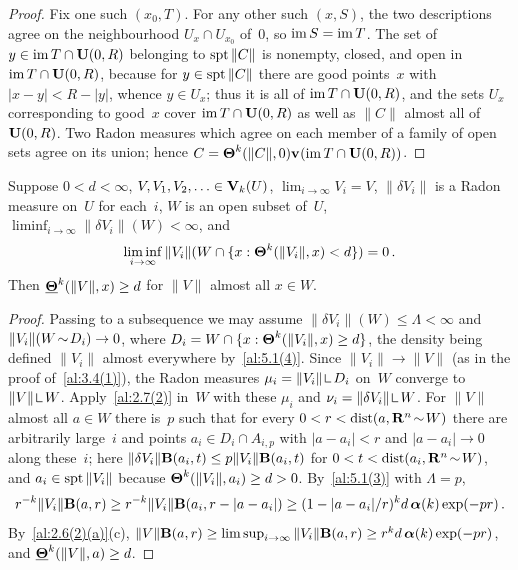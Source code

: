 \begin{proof}
    Fix one such $(x_0,T)$. For any other such $(x,S)$, the two descriptions agree on the
    neighbourhood $U_x \cap U_{x_0}$ of~$0$, so $\operatorname{im} S = \operatorname{im} T$. The set of $y \in \operatorname{im} T \cap
    \mathbf{U}(0,R)$ belonging to $\operatorname{spt} \|C\|$ is nonempty, closed, and open in $\operatorname{im} T \cap
    \mathbf{U}(0,R)$, because for $y \in \operatorname{spt} \|C\|$ there are good points~$x$ with $|x - y| < R -
    |y|$, whence $y \in U_x$; thus it is all of $\operatorname{im} T \cap \mathbf{U}(0,R)$, and the sets $U_x$
    corresponding to good~$x$ cover $\operatorname{im} T \cap \mathbf{U}(0,R)$ as well as $\|C\|$ almost all of
    $\mathbf{U}(0,R)$. Two Radon measures which agree on each member of a family of open sets agree on
    its union; hence $C = \boldsymbol{\Theta}^{k}(\|C\|,0) \mathbf{v}_{}(\operatorname{im} T \cap \mathbf{U}(0,R))$.
\end{proof}

\begin{lemma}
    \label{al:5.4}
    Suppose $0 < d < \infty$, $V, V_1, V_2, \ldots \in \mathbf{V}_{k}(U)$, $\lim_{i \to \infty} V_i
    = V$, $\|\delta V_i\|$ is a Radon measure on~$U$ for each~$i$, $W$ is an open subset of~$U$,
    $\liminf_{i \to \infty} \|\delta V_i\|(W) < \infty$, and
    \begin{displaymath}
        \liminf_{i \to \infty} \|V_i\|(W \cap \{ x : \boldsymbol{\Theta}^{k}(\|V_i\|,x) < d \}) = 0 \,.
    \end{displaymath}
    Then $\boldsymbol{\underline{\Theta}}^{k}(\|V\|,x) \ge d$ for $\|V\|$ almost all $x \in W$.
\end{lemma}

\begin{proof}
    Passing to a subsequence we may assume $\|\delta V_i\|(W) \le \Lambda < \infty$ and $\|V_i\|(W
    \!\sim\! D_i) \to 0$, where $D_i = W \cap \{ x : \boldsymbol{\Theta}^{k}(\|V_i\|,x) \ge d \}$, the
    density being defined $\|V_i\|$ almost everywhere by~\ref{al:5.1(4)}. Since $\|V_i\| \to
    \|V\|$ (as in the proof of~\ref{al:3.4(1)}), the Radon measures $\mu_i = \|V_i\| \restrict
    D_i$ on~$W$ converge to $\|V\| \restrict W$. Apply~\ref{al:2.7(2)} in~$W$ with these $\mu_i$
    and $\nu_i = \|\delta V_i\| \restrict W$. For $\|V\|$ almost all $a \in W$ there is~$p$ such
    that for every $0 < r < \operatorname{dist}(a, \mathbf{R}^{n} \!\sim\! W)$ there are arbitrarily large~$i$ and
    points $a_i \in D_i \cap A_{i,p}$ with $|a - a_i| < r$ and $|a - a_i| \to 0$ along these~$i$;
    here $\|\delta V_i\| \mathbf{B}(a_i,t) \le p \|V_i\| \mathbf{B}(a_i,t)$ for $0 < t <
    \operatorname{dist}(a_i, \mathbf{R}^{n} \!\sim\! W)$, and $a_i \in \operatorname{spt} \|V_i\|$ because
    $\boldsymbol{\Theta}^{k}(\|V_i\|,a_i) \ge d > 0$. By~\ref{al:5.1(3)} with $\Lambda = p$,
    \begin{displaymath}
        r^{-k} \|V_i\| \mathbf{B}(a,r) \ge r^{-k} \|V_i\| \mathbf{B}(a_i,r - |a - a_i|) \ge (1 - |a
        - a_i|/r)^{k} d \, \boldsymbol{\alpha}(k) \exp(-p r) \,.
    \end{displaymath}
    By~\ref{al:2.6(2)(a)}(c), $\|V\| \mathbf{B}(a,r) \ge \limsup_{i \to \infty} \|V_i\| \mathbf{B}(a,r)
    \ge r^{k} d \, \boldsymbol{\alpha}(k) \exp(-pr)$, and $\boldsymbol{\underline{\Theta}}^{k}(\|V\|,a) \ge d$.
\end{proof}

